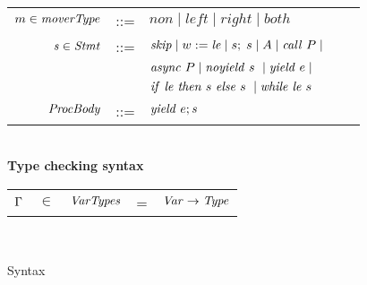 \begin{figure}
\begin{tabular}{rclcl}
\end{tabular}
\begin{tabular}{rclcl}
$m \in \mathit{moverType}$ &::= &$\mathit{non} \mid \mathit{left} \mid \mathit{right} \mid \mathit{both}$ \\
$\mathit{s} \in \mathit{Stmt}$ &::= & $\mathit{skip} \mid w := \mathit{le} \mid s;\;s \mid A \mid \mathit{call}\ P \mid $ \\
                  & & $\mathit{async}\ P \mid \mathit{noyield}\ {s}\  \mid \mathit{yield}\ e \mid $\\
                  & & ${\mathit{if}\ {\mathit{le}}\ }{\mathit{then}\ {s}\ }{\mathit{else}\ {s}\ } \mid {\mathit{while}\ {\mathit{le}}\ {s}\ }$
                  \\ 
$\mathit{ProcBody}$ & ::= & $\mathit{yield}\ e; \mathit{s}$ \\ 
\end{tabular}\\
{\bf Type checking syntax} \\
\begin{tabular}{rclcl}
$\Gamma$ & $\in$ & $\mathit{VarTypes}$ & = & $\mathit{Var}\rightarrow\mathit{Type}$ \\
\end{tabular} \\
\setlength{\tabcolsep}{6pt}
\caption{Syntax}
\label{fig:syntax}
\end{figure}




